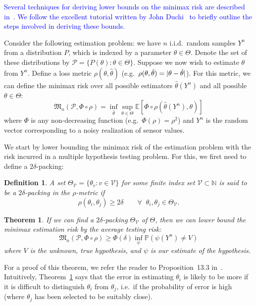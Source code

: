 \documentclass[conference]{IEEEtran}
\DeclarePairedDelimiter\abs{\lvert}{\rvert}
\newcommand{\Phiorho}{\Phi\!\circ\!\rho}
\newtheorem{theorem}{Theorem}
\newtheorem{definition}{Definition}
\begin{document}
\textcolor{blue}{
Several techniques for deriving lower bounds on the minimax risk are described
in~\cite{Tsybakov2009Introduction}. We follow the excellent tutorial written by
John Duchi~\cite{Duchi2015Information} to briefly outline the steps involved in
deriving these bounds.
}

Consider the following estimation problem: we have $n$ i.i.d.\ random samples
$Y^n$ from a distribution $P$, which is indexed by a parameter $\theta \in
\Theta$.  Denote the set of these distributions by $\mathcal{P} = \{P(\theta) :
\theta \in \Theta\}$. Suppose we now wish to estimate $\theta$ from $Y^n$.
Define a loss metric $\rho(\theta, \hat\theta)$ (e.g.\ $\rho(\theta,
\hat\theta) = \abs{\theta - \hat\theta}$). For this metric, we can define the
minimax risk over all possible estimators $\hat\theta(Y^n)$ and all possible
$\theta \in \Theta$:
\begin{equation} \label{eq:minimax-expr}
	\mathfrak{M}_n(\mathcal{P}, \Phiorho) = \inf_{\hat\theta} \sup_{\theta \in \Theta} \mathbb E[\Phiorho (\hat\theta(Y^n), \theta)]
\end{equation}
where $\Phi$ is any non-decreasing function (e.g.\ $\Phi(\rho) = \rho^2$) and
$Y^n$ is the random vector corresponding to a noisy realization of sensor
values.

We start by lower bounding the minimax risk of the estimation problem with the
risk incurred in a multiple hypothesis testing problem. For this, we first need
to define a $2\delta$-packing:%
\begin{definition}
	A set $\Theta_{\mathcal{V}} = \{ \theta_v : v \in \mathcal{V} \}$ for some
	finite index set $\mathcal{V} \subset \mathbb N$ is said to be a
	$2\delta$-packing in the $\rho$-metric if
	\begin{equation}
		\rho(\theta_i, \theta_j) \geq 2\delta \qquad \forall \;\; \theta_i, \theta_j \in \Theta_{\mathcal{V}}.
	\end{equation}
\end{definition}
\begin{theorem} \label{thm:est-to-testing}%
	If we can find a $2\delta$-packing $\Theta_{\mathcal{V}}$ of $\Theta$, then
	we can lower bound the minimax estimation risk by the average testing risk:
	\begin{equation}
		\mathfrak{M}_n(\mathcal{P}, \Phiorho) \geq \Phi(\delta) \inf_\psi \mathbb P (\psi(Y^n) \neq V)
	\end{equation}
	where $V$ is the unknown, true hypothesis, and $\psi$ is our estimate of
	the hypothesis.
\end{theorem}
For a proof of this theorem, we refer the reader to Proposition~13.3
in~\cite{Duchi2015Information}.  Intuitively, Theorem~\ref{thm:est-to-testing}
says that the error in estimating $\theta_i$ is likely to be more if it is
difficult to distinguish $\theta_i$ from $\theta_j$, i.e.\ if the probability
of error is high (where $\theta_j$ has been selected to be suitably close).
\end{document}
